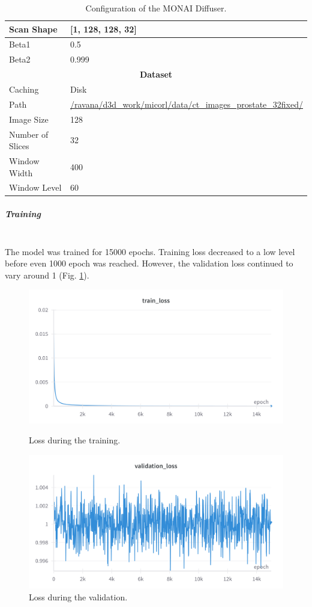 \begin{table}[H]
\begin{tabular}{|l|l|}
Scan Shape & [1, 128, 128, 32] \\
\hline
Beta1 & 0.5 \\
\hline
Beta2 & 0.999 \\
\hline
\multicolumn{2}{|c|}{\textbf{Dataset}} \\
\hline
Caching & Disk \\
\hline
Path & \url{/ravana/d3d\_work/micorl/data/ct\_images\_prostate\_32fixed/} \\
\hline
Image Size & 128 \\
\hline
Number of Slices & 32 \\
\hline
Window Width & 400 \\
\hline
Window Level & 60 \\
\hline
\end{tabular}
\caption{Configuration of the MONAI Diffuser.}
\label{table:monai_diffuser_params}
\end{table}

\newpage
\subparagraph{Training}\mbox{}\\

The model was trained for 15000 epochs. Training loss decreased to a low level before even 1000 epoch was reached. However, the validation loss continued to vary around 1 (Fig. \ref{fig:ldm_a1_val_loss}). 

\begin{figure}[H]
\includegraphics[width=\linewidth]{detailed_engineering/Monai Diffusion - Attempt 1/charts/train_loss.png}
\caption{Loss during the training.}
\endminipage\hfill
{}
\includegraphics[width=\linewidth]{detailed_engineering/Monai Diffusion - Attempt 1/charts/validation_loss.png}
\caption{Loss during the validation.}
\label{fig:ldm_a1_val_loss}
\endminipage
\end{figure}



